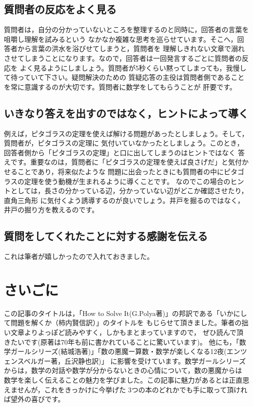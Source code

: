 \documentclass[./main]{subfiles}
\begin{document}
\subsection{質問者の反応をよく見る}

質問者は，自分の分かっていないところを整理するのと同時に，回答者の言葉を咀嚼し理解を試みるという
なかなか複雑な思考を巡らせています。そこへ，回答者から言葉の洪水を浴びせてしまうと，質問者を
理解しきれない文章で溺れさせてしまうことになります。なので，回答者は一回発言するごとに質問者の反応を
よく見るようにしましょう。質問者が5秒くらい黙ってしまっても，我慢して待っていて下さい。疑問解決のための
質疑応答の主役は質問者側であることを常に意識するのが大切です。質問者に数学をしてもらうことが
肝要です。

\subsection{いきなり答えを出すのではなく，ヒントによって導く}

例えば，ピタゴラスの定理を使えば解ける問題があったとしましょう。そして，質問者が，ピタゴラスの定理に
気付いていなかったとしましょう。このとき，回答者側から「ピタゴラスの定理」と口に出してしまうのはヒントではなく
答えです。重要なのは，質問者に「ピタゴラスの定理を使えば良さげだ」と気付かせることであり，将来似たような
問題に出会ったときにも質問者の中にピタゴラスの定理を使う動機が生まれるように導くことです。
なのでこの場合のヒントとしては，長さの分かっている辺，分かっていない辺がどこか確認させたり，直角三角形
に気付くよう誘導するのが良いでしょう。井戸を掘るのではなく，井戸の掘り方を教えるのです。

\subsection{質問をしてくれたことに対する感謝を伝える}

これは筆者が嬉しかったので入れておきました。

\section{さいごに}
この記事のタイトルは，「How to Solve It(G.Polya著)」の邦訳である「いかにして問題を解くか（柿内賢信訳）」のタイトルを
もじらせて頂きました。筆者の拙い文章よりよっぽど読みやすく，しかもまとまっていますので，
ぜひ読んで頂きたいです(原著は70年も前に書かれていることに驚いています)。
他にも，「数学ガールシリーズ(結城浩著)」「数の悪魔ー算数・数学が楽しくなる12夜(エンツェンスベルガー著，丘沢静也訳)」
に影響を受けています。数学ガールシリーズからは，数学の対話や数学が分からないときの心情について，数の悪魔からは
数学を楽しく伝えることの魅力を学びました。この記事に魅力があるとは正直思えませんが，これをきっかけに今挙げた
3つの本のどれかでも手に取って頂ければ望外の喜びです。
\end{document}
